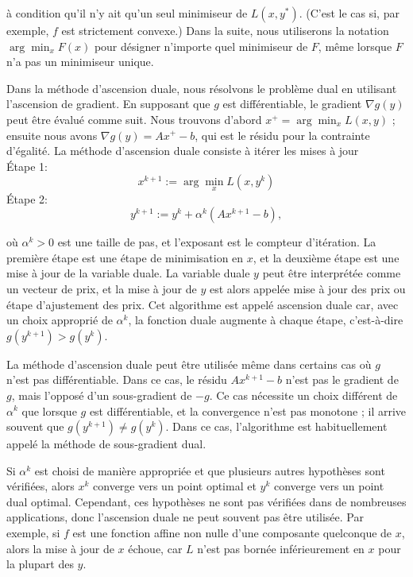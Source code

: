 à condition qu'il n'y ait qu'un seul minimiseur de \( L(x, y^*) \). (C'est le cas si, par exemple, \( f \) est strictement convexe.) Dans la suite, nous utiliserons la notation \(\arg\min_x F(x)\) pour désigner n'importe quel minimiseur de \( F \), même lorsque \( F \) n'a pas un minimiseur unique.

Dans la méthode d'ascension duale, nous résolvons le problème dual en utilisant l'ascension de gradient. En supposant que \( g \) est différentiable, le gradient \( \nabla g(y) \) peut être évalué comme suit. Nous trouvons d'abord \( x^+ = \arg\min_x L(x, y) \) ; ensuite nous avons \( \nabla g(y) = Ax^+ - b \), qui est le résidu pour la contrainte d'égalité. La méthode d'ascension duale consiste à itérer les mises à jour\\
Étape 1: 
\begin{equation}x^{k+1} := \arg\min_x L(x, y^k) \end{equation}
Étape 2: 
\begin{equation}y^{k+1} := y^k + \alpha^k (Ax^{k+1} - b),\end{equation}

où \( \alpha^k > 0 \) est une taille de pas, et l'exposant est le compteur d'itération. La première étape est une étape de minimisation en \( x \), et la deuxième étape est une mise à jour de la variable duale. La variable duale \( y \) peut être interprétée comme un vecteur de prix, et la mise à jour de \( y \) est alors appelée mise à jour des prix ou étape d'ajustement des prix. Cet algorithme est appelé ascension duale car, avec un choix approprié de \( \alpha^k \), la fonction duale augmente à chaque étape, c'est-à-dire \( g(y^{k+1}) > g(y^k) \).

La méthode d'ascension duale peut être utilisée même dans certains cas où \( g \) n'est pas différentiable. Dans ce cas, le résidu \( Ax^{k+1} - b \) n'est pas le gradient de \( g \), mais l'opposé d'un sous-gradient de \(-g\). Ce cas nécessite un choix différent de \( \alpha^k \) que lorsque \( g \) est différentiable, et la convergence n'est pas monotone ; il arrive souvent que \( g(y^{k+1}) \neq g(y^k) \). Dans ce cas, l'algorithme est habituellement appelé la méthode de sous-gradient dual.

Si \( \alpha^k \) est choisi de manière appropriée et que plusieurs autres hypothèses sont vérifiées, alors \( x^k \) converge vers un point optimal et \( y^k \) converge vers un point dual optimal. Cependant, ces hypothèses ne sont pas vérifiées dans de nombreuses applications, donc l'ascension duale ne peut souvent pas être utilisée. Par exemple, si \( f \) est une fonction affine non nulle d'une composante quelconque de \( x \), alors la mise à jour de \( x \) échoue, car \( L \) n'est pas bornée inférieurement en \( x \) pour la plupart des \( y \).

